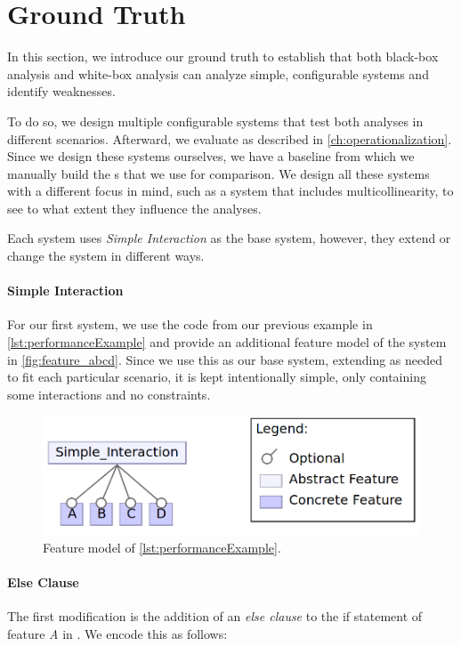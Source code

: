 \section{Ground Truth}\label{sec:ground-truth}
In this section, we introduce our ground truth to establish that both black-box analysis 
and white-box analysis can analyze simple, configurable systems and identify weaknesses. 

To do so, we design multiple configurable systems that test both analyses in different scenarios. 
Afterward, we evaluate as described in \autoref{ch:operationalization}. 
Since we design these systems ourselves, we have a baseline from which we manually build the {\perfInfluenceModel}s that we use for comparison. 
We design all these systems with a different focus in mind, such as a system that includes multicollinearity, 
to see to what extent they influence the analyses. 

Each system uses \emph{Simple Interaction} as the base system, however, they extend or change the system in different ways.

\paragraph{Simple Interaction}\label{ground-truth:Simple}
For our first system, we use the code from our previous example in \autoref{lst:performanceExample} and provide an additional feature model 
of the system in \autoref{fig:feature_abcd}. 
Since we use this as our base system, extending as needed to fit each
particular scenario, it is kept intentionally simple, only containing some interactions and no constraints.

\begin{figure}[h]
    \centering
    \includegraphics[scale=0.25]{gfx/Feature_ABCD.png}
    \caption{Feature model of \autoref{lst:performanceExample}.}
    \label{fig:feature_abcd}
\end{figure}


\paragraph{Else Clause}
The first modification is the addition of an \emph{else clause} to the if statement of feature \emph{A} in . 
We encode this as follows:

